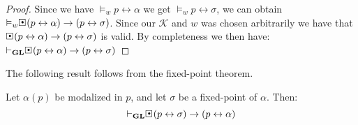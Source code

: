 \documentclass[../main.tex]{subfiles}
\begin{document}
\begin{proof}
	Since we have $\vDash_w p\leftrightarrow\alpha$ we get $\vDash_w
	p\leftrightarrow\sigma$, we can obtain
	$\vDash_w\sBox(p\leftrightarrow\alpha)\rightarrow(p\leftrightarrow\sigma)$.
	Since our $\mathcal{K}$ and $w$ was chosen arbitrarily we have that
	$\sBox(p\leftrightarrow\alpha)\rightarrow(p\leftrightarrow\sigma)$ is
	valid. By completeness we then have:
	$\vdash_\GL\sBox(p\leftrightarrow\alpha)\rightarrow(p\leftrightarrow
	\sigma)$
\end{proof}

The following result follows from the fixed-point theorem.
\begin{thm}\label{thm:exi}
	Let $\alpha(p)$ be modalized in $p$, and let $\sigma$ be a fixed-point
	of $\alpha$. Then:
	\[\vdash_\GL\sBox(p\leftrightarrow\sigma)\rightarrow(p\leftrightarrow\alpha)\]
\end{thm}
\end{document}
